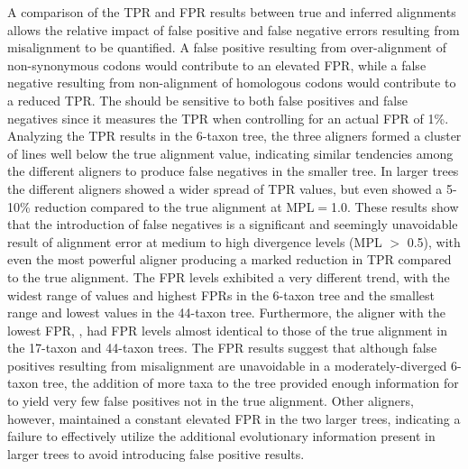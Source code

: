 \documentclass{mbe}
\begin{document}
A comparison of the TPR and FPR results between true and inferred
alignments allows the relative impact of false positive and false
negative errors resulting from misalignment to be quantified. A false
positive resulting from over-alignment of non-synonymous codons would
contribute to an elevated FPR, while a false negative resulting from
non-alignment of homologous codons would contribute to a reduced
TPR. The \tpr{} should be sensitive to both false positives and false
negatives since it measures the TPR when controlling for an actual FPR
of 1\%. Analyzing the TPR results in the 6-taxon tree, the three
aligners formed a cluster of lines well below the true alignment
value, indicating similar tendencies among the different aligners to
produce false negatives in the smaller tree. In larger trees the
different aligners showed a wider spread of TPR values, but even
\prankc{} showed a 5-10\% reduction compared to the true alignment at
MPL$=$1.0. These results show that the introduction of false negatives
is a significant and seemingly unavoidable result of alignment error
at medium to high divergence levels (MPL $>$ 0.5), with even the most
powerful aligner producing a marked reduction in TPR compared to the
true alignment. The FPR levels exhibited a very different trend, with
the widest range of values and highest FPRs in the 6-taxon tree and
the smallest range and lowest values in the 44-taxon
tree. Furthermore, the aligner with the lowest FPR, \prankc{}, had FPR
levels almost identical to those of the true alignment in the 17-taxon
and 44-taxon trees. The FPR results suggest that although false
positives resulting from misalignment are unavoidable in a
moderately-diverged 6-taxon tree, the addition of more taxa to the
tree provided enough information for \prankc{} to yield very few false
positives not in the true alignment. Other aligners, however,
maintained a constant elevated FPR in the two larger trees, indicating
a failure to effectively utilize the additional evolutionary
information present in larger trees to avoid introducing false
positive results.
\end{document}
